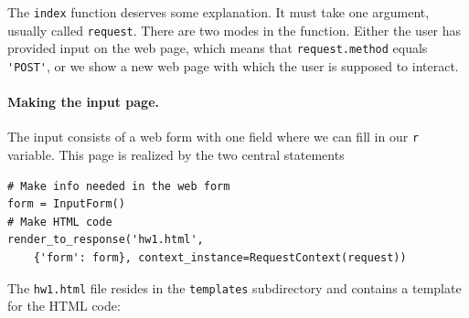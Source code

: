 \documentclass[%
oneside,                 %
final,                   %
10pt]{article}
\begin{document}
The \Verb!index! function deserves some explanation. It must take one
argument, usually called \Verb!request!. There are two modes in the function. Either
the user has provided input on the web page, which means that
\Verb!request.method! equals \Verb!'POST'!, or we show a new web page
with which the user is supposed to interact.


\paragraph{Making the input page.}
The input consists of a web form with
one field where we can fill in our \Verb!r! variable. This page
is realized by the two central statements

\begin{Verbatim}[numbers=none,fontsize=\fontsize{9pt}{9pt},baselinestretch=0.85]
# Make info needed in the web form
form = InputForm()
# Make HTML code
render_to_response('hw1.html',
    {'form': form}, context_instance=RequestContext(request))
\end{Verbatim}
The \Verb!hw1.html! file resides in the \Verb!templates! subdirectory and contains
a template for the HTML code:
\end{document}
